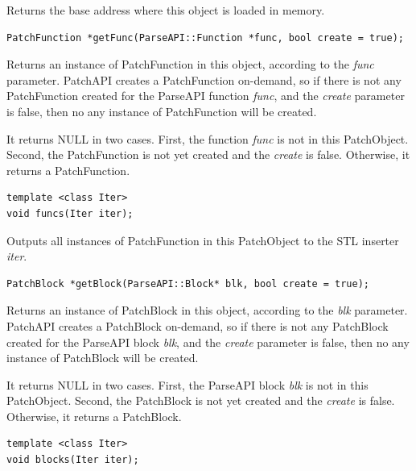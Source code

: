 \documentclass[11pt]{article}
\begin{document}
Returns the base address where this object is loaded in memory.


\begin{verbatim}
PatchFunction *getFunc(ParseAPI::Function *func, bool create = true);

\end{verbatim}



Returns an instance of PatchFunction in this object, according to the \emph{func}
parameter. PatchAPI creates a PatchFunction on-demand, so if there is not any
PatchFunction created for the ParseAPI function \emph{func}, and the \emph{create}
parameter is false, then no any instance of PatchFunction will be created.

It returns NULL in two cases. First, the function \emph{func} is not in this
PatchObject. Second, the PatchFunction is not yet created and the \emph{create} is
false. Otherwise, it returns a PatchFunction.


\begin{verbatim}
template <class Iter>
void funcs(Iter iter);

\end{verbatim}



Outputs all instances of PatchFunction in this PatchObject to the STL inserter
\emph{iter}.


\begin{verbatim}
PatchBlock *getBlock(ParseAPI::Block* blk, bool create = true);

\end{verbatim}



Returns an instance of PatchBlock in this object, according to the \emph{blk}
parameter. PatchAPI creates a PatchBlock on-demand, so if there is not any
PatchBlock created for the ParseAPI block \emph{blk}, and the \emph{create} parameter is
false, then no any instance of PatchBlock will be created.

It returns NULL in two cases. First, the ParseAPI block \emph{blk} is not in this
PatchObject. Second, the PatchBlock is not yet created and the \emph{create} is
false. Otherwise, it returns a PatchBlock.


\begin{verbatim}
template <class Iter>
void blocks(Iter iter);

\end{verbatim}
\end{document}
